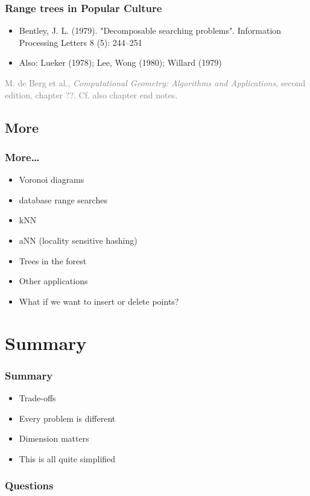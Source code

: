 \documentclass{beamer}
\begin{document}
\begin{frame}
  \frametitle{Range trees in Popular Culture}
  \begin{itemize}
  \item Bentley, J. L. (1979). "Decomposable searching
    problems". Information Processing Letters 8 (5): 244–251
  \item Also: Lueker (1978); Lee, Wong (1980); Willard (1979)
  \end{itemize}

  \bigskip \textcolor{gray}{ 
    M. de Berg et al., \textit{Computational Geometry: Algorithms and
      Applications}, second edition, chapter ??.  Cf. also chapter end
    notes.}


\end{frame}

\subsection{More}

\begin{frame}
  \frametitle{More\dots}
  \begin{itemize}
  \item Voronoi diagrams
  \item database range searches
  \item kNN
  \item aNN (locality sensitive hashing)
  \item Trees in the forest
  \item Other applications
  \item What if we want to insert or delete points?
  \end{itemize}
\end{frame}


\section*{Summary}

\begin{frame}
  \frametitle{Summary}  

  \begin{itemize}
  \item Trade-offs
  \item Every problem is different
  \item Dimension matters
  \item This is all quite simplified
  \end{itemize}
\end{frame}

\begin{frame}
  \frametitle{Questions}  
\end{frame}
\end{document}
